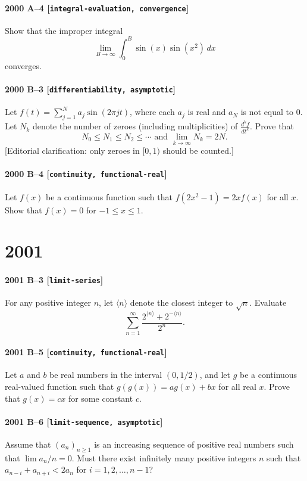 \documentclass[11pt]{article}
\begin{document}
\paragraph{2000 A--4 \textnormal{[\texttt{integral-evaluation, convergence}]}}
Show that the improper integral
\[ \lim_{B\to\infty}\int_{0}^B \sin(x) \sin(x^2)\,dx\]
converges.

\paragraph{2000 B--3 \textnormal{[\texttt{differentiability, asymptotic}]}}
Let $f(t)=\sum_{j=1}^N a_j \sin(2\pi jt)$, where each $a_j$ is real
and
$a_N$ is not equal to 0. Let $N_k$ denote the number of zeroes (including
multiplicities) of $\frac{d^k f}{dt^k}$.
Prove that
\[N_0\leq N_1\leq N_2\leq \cdots \mbox{ and } \lim_{k\to\infty} N_k = 2N.\]
[Editorial clarification: only zeroes in $[0, 1)$ should be counted.]

\paragraph{2000 B--4 \textnormal{[\texttt{continuity, functional-real}]}}
Let $f(x)$ be a continuous function such that $f(2x^2-1)=2xf(x)$ for
all $x$. Show that $f(x)=0$ for $-1\leq x\leq 1$.

\section*{2001}

\paragraph{2001 B--3 \textnormal{[\texttt{limit-series}]}}
For any positive integer $n$, let $\langle n\rangle$ denote
the closest integer to $\sqrt{n}$. Evaluate
\[\sum_{n=1}^\infty \frac{2^{\langle n\rangle}+2^{-\langle n\rangle}}
                         {2^n}.\]

\paragraph{2001 B--5 \textnormal{[\texttt{continuity, functional-real}]}}
Let $a$ and $b$ be real numbers in the interval $(0,1/2)$, and
let $g$ be a continuous real-valued function such that
$g(g(x))= ag(x)+bx$ for all real $x$. Prove that
$g(x)=cx$ for some constant $c$.

\paragraph{2001 B--6 \textnormal{[\texttt{limit-sequence, asymptotic}]}}
Assume that $(a_n)_{n\geq 1}$ is an increasing sequence of
positive real numbers such that
$\lim a_n/n=0$. Must there exist infinitely many positive integers
$n$ such that $a_{n-i}+a_{n+i}<2a_n$ for $i=1,2,\ldots,n-1$?
\end{document}
